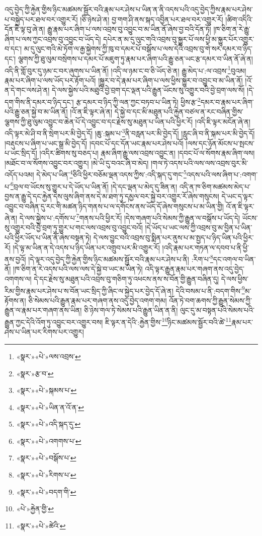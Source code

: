 འདུ་བྱེད་ཀྱི་རྐྱེན་གྱིས་ཉིང་མཚམས་སྦྱོར་བའི་རྣམ་པར་ཤེས་པ་ཡིན་ན་ནི་འདས་པའི་འདུ་བྱེད་ཀྱིས་རྣམ་པར་ཤེས་པ་བསྐྱེད་པར་ཐལ་བར་འགྱུར་རོ། །ཅི་ཉེས་ཤེ་ན། བྱ་གག་ཤི་ནས་སྐད་འབྱིན་པར་ཐལ་བར་འགྱུར་རོ། །ཚིག་འདིའི་དོན་ཇི་ལྟ་བུ་ཞེ་ན། རྒྱུ་རྣམ་པར་ཞིག་པ་ལས་འབྲས་བུ་འབྱུང་བ་མ་ཡིན་ནོ་ཞེས་བྱ་བའི་དོན་ཏོ། །ཁ་ཅིག་ན་རེ་རྒྱུ་ཞིག་པ་ལས་ཀྱང་འབྲས་བུ་འབྱུང་བ་ཡོད་དེ། དཔེར་ན་མ་དུ་ལུང་གའི་འབྲས་བུ་སྐྱུར་པོ་ལས་ཕྱི་མ་སྐྱུར་པོར་འགྱུར་བ་དང་། མ་དུ་ལུང་གའི་མེ་ཏོག་ལ་རྒྱ་སྐྱེགས་ཀྱི་ཁུ་བ་དམར་པོ་བསྒོས་པ་ལས་དེའི་འབྲས་བུ་གེ་སར་དམར་བ་ཉིད་དང་། ལྕགས་ཀྱི་ཐུ་ལུམ་བསྲེགས་པ་དམར་པོ་མཇུག་ཏུ་རྣམ་པར་ཞིག་པའི་རྒྱུ་ཅན་ཡང་རྩ་དམར་བ་ཡིན་ནོ་ཞེ་ན། འདི་ནི་གློ་བུར་དུ་ཉམ་ང་བར་ཞུགས་པ་ཡིན་ནོ། །འདི་ལ་ཉམ་ང་བ་ཅི་ཡོད་ཅེ་ན། རྒྱུ་མེད་པ་:ལ་འབྲས་\footnote{«སྣར་»«པེ་»ལས་འབྲས་}བུའམ། རྣམ་པར་ཞིག་པ་ལས་ཡོད་པར་རྟོག་པའོ། །སྐྱུར་བ་དེ་རྣམ་པར་ཞིག་པ་ལས་ཕྱིས་སྐྱུར་བ་འབྱུང་བ་མ་ཡིན་ནོ། །འོ་ན་དེ་གང་ལས་ཤེ་ན། དེ་ལས་སྐྱེས་པའི་མཐུའི་བྱེ་བྲག་དང་ལྡན་པའི་རྒྱུན་ཡོངས་སུ་འགྱུར་བའི་བྱེ་བྲག་ལས་སོ། །དེ་དག་གིས་ནི་དམར་བ་ཉིད་དང་། རྩ་དམར་བ་ཉིད་ཀྱི་ལན་ཀྱང་བཏབ་པ་ཡིན་ཏེ། ཕྱིས་རྩ་\footnote{«སྣར་»རྩ་བ་}དམར་བ་རྣམ་པར་ཞིག་པའི་རྒྱུ་ཅན་སྐྱེ་བ་མ་ཡིན་ནོ། །འོ་ན་ཇི་ལྟར་ཞེ་ན། དེ་སྐྱེ་བ་དང་མི་མཐུན་པའི་རྐྱེན་བཙལ་ན་རང་བཞིན་གྱིས་ལྕགས་ཀྱི་ཐུ་ལུམ་འབྱུང་བ་ཆེན་པོ་དེ་འབྱུང་བ་དང་རྗེས་སུ་མཐུན་པ་ཡིན་པའི་ཕྱིར་རོ། །འདི་ཇི་ལྟར་མངོན་ཞེ་ན། འདི་ལྟར་མེ་ཤི་བ་ནི་སྲེག་པར་མི་བྱེད་དོ། །ཆུ་:སྐམ་པ་\footnote{«སྣར་»«པེ་»སྐམས་པ་}ནི་བརླན་པར་མི་བྱེད་དོ། །རླུང་ཞི་བ་ནི་སྐམ་པར་མི་བྱེད་དོ། །བརྡུངས་པ་ཞིག་པ་ཡང་སྒྲ་མི་བྱེད་དོ། །དབང་པོ་དང་དོན་ཡང་རྣམ་པར་ཤེས་པའོ། །ལས་དང་ཉོན་མོངས་པ་སྤངས་པ་ཡང་སྲིད་དོ། །འདིར་ཚིགས་སུ་བཅད་པ། རྣམ་ཞིག་རྒྱུ་ལས་འབྲས་འབྱུང་ན། །དབང་པོ་ལ་སོགས་རྣམ་ཞིག་ལས། །མཐོང་བ་ལ་སོགས་འབྱུང་བར་འགྱུར། །མེ་ཡི་དུ་བའང་ཞི་བ་མེད། །གལ་ཏེ་འདས་པའི་ལས་ལས་འབྲས་བུར་མི་འདོད་པའམ། དེ་མེད་པ་ཡིན་\footnote{«སྣར་»«པེ་»ཡིན་ན་འོ་ན་}ཅིའི་ཕྱིར་བཅོམ་ལྡན་འདས་ཀྱིས་:འདི་སྐད་དུ་གང་\footnote{«སྣར་»«པེ་»འདི་སྐད་དུ་}འདས་པའི་ལས་ཞིག་པ་:འགག་པ་\footnote{«སྣར་»«པེ་»འགགས་པ་}བྲལ་བ་ཡོངས་སུ་གྱུར་པ་དེ་ཡོད་པ་ཡིན་ནོ། །དེ་དང་ལྡན་པ་མེད་དུ་ཟིན་ན། འདི་ན་ཁ་ཅིག་མཚམས་མེད་པ་བྱས་ན་རྒྱུ་དེ་དང་རྐྱེན་དེས་ལུས་ཞིག་ནས་དེ་མ་ཐག་ཏུ་དམྱལ་བར་སྐྱེ་བར་འགྱུར་རོ་ཞེས་གསུངས། དེ་ཡང་ད་ལྟར་འབྱུང་བ་བཞིན་དུ་རང་གི་མཚན་ཉིད་གནས་པ་ལ་དགོངས་ནས་ཡོད་དོ་ཞེས་གསུངས་པ་མ་ཡིན་གྱི། འོ་ན་ཇི་ལྟར་ཞེ་ན། དེ་ལས་སྐྱེས་པ་:དགོས་པ་\footnote{«སྣར་»«པེ་»བསྒོས་པ་}གནས་པའི་ཕྱིར་རོ། །དེས་གཞག་པའི་སེམས་ཀྱི་རྒྱུན་ལ་བསྒོས་པ་ཡོད་དེ། ཡོངས་སུ་འགྱུར་བའི་བྱེ་བྲག་ཏུ་གྱུར་པ་གང་ལས་འབྲས་བུ་འབྱུང་བའོ། །དེ་ཡོད་པ་ཡང་ལས་ཀྱི་འབྲས་བུ་མ་བྱིན་པ་ཡིན་པའི་ཕྱིར་ཡོད་པ་ཡིན་ནོ་ཞེས་བསྟན་ཏེ། དེ་ལས་བྱུང་བའི་འབྲས་བུ་སྨིན་པར་ནུས་པ་མ་སྤྱད་པ་ཉིད་ཡིན་པའི་ཕྱིར་རོ། །དེ་ལྟ་མ་ཡིན་ན་དེ་འདས་པ་ཉིད་ཡིན་པར་འགྲུབ་པར་མི་འགྱུར་རོ། །འདི་རྣམ་པར་གཏན་ལ་དབབ་པ་ནི་ཕྱི་ནས་བྱའོ། །དེ་ལྟར་འདུ་བྱེད་ཀྱི་རྐྱེན་གྱིས་ཉིང་མཚམས་སྦྱོར་བའི་རྣམ་པར་ཤེས་པ་ནི། :རིག་པ་\footnote{«སྣར་»«པེ་»རིགས་པ་}དང་འགལ་བ་ཡིན་ནོ། །ཁ་ཅིག་ན་རེ་འདས་པའི་ལས་ལས་དེ་སྐྱེ་བ་ཡང་མ་ཡིན་ཏེ། འདི་ལྟར་རྒྱུན་རྣམ་པར་གཞག་ནས་འདུ་བྱེད་འགགས་ལ། དེ་དང་རྗེས་སུ་མཐུན་པའི་འབྲས་བུ་གཅིག་ཏུ་འཕངས་ནས་ས་བོན་གྱི་རྒྱུན་བཞིན་དུ། དེ་ལས་ཕྱིས་རིམ་གྱིས་རྣམ་པར་ཤེས་པ་ས་བོན་ཡང་སྲིད་ཀྱི་ཞིང་ལ་སྐྱེད་པར་བྱེད་དོ་ཞེ་ན། དེའི་བསམ་པ་ནི་:བདག་གིས་\footnote{«སྣར་»«པེ་»བདག་གི་}མ་རྟོགས་ན། ཅི་སེམས་པའི་རྒྱུན་རྣམ་པར་གཞག་ནས་འདུ་བྱེད་འགག་གམ། འོན་ཏེ་བག་ཆགས་ཀྱི་རྒྱུན་སེམས་ཀྱི་རྒྱུན་ལ་རྣམ་པར་གཞག་ནས་ཡིན། ཅི་ཉེས་གལ་ཏེ་སེམས་པའི་རྒྱུན་ཡིན་ན་ནི། ལུང་དུ་མ་བསྟན་པའི་སེམས་པའི་རྒྱུན་ཀྱང་དེའི་འོག་ཏུ་འབྱུང་བར་འགྱུར་བས། ཇི་ལྟར་ན་དེའི་:རྐྱེན་གྱིས་\footnote{«པེ་»རྐྱེན་གྱི་}ཉིང་མཚམས་སྦྱོར་བའི་ཚེ་\footnote{«སྣར་»«པེ་»ཚེའི་}རྣམ་པར་ཤེས་པ་ཡིན་པར་རིགས་པར་འགྱུར། 